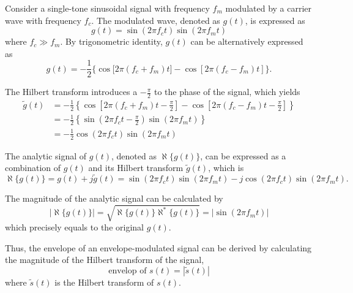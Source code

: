 \documentclass[../ECE459FinalProjectReport.tex]{subfiles}
\begin{document}
Consider a single-tone sinusoidal signal with frequency $f_m$ modulated by a carrier wave with frequency $f_c$. The modulated wave, denoted as $g(t)$, is expressed as
\begin{equation}
    g(t) = \sin(2\pi f_c t)\sin(2\pi f_m t)
\end{equation}
where $f_c\gg f_m$. By trigonometric identity, $g(t)$ can be alternatively expressed as
\begin{equation}
    g(t)=-\frac{1}{2}\{\cos\mathrm[2\pi (f_c+f_m)t]-\cos[2\pi (f_c-f_m)t]\}.
\end{equation}

The Hilbert transform introduces a $-\frac{\pi}{2}$ to the phase of the signal, which yields
\begin{equation}
    \begin{aligned}
        \tilde{g}(t)&=-\frac{1}{2}\left\lbrace\cos\left[2\pi (f_c+f_m)t - \frac{\pi}{2}\right]-\cos\left[2\pi (f_c-f_m)t - \frac{\pi}{2}\right]\right\rbrace\\
        &=-\frac{1}{2}\left\{ \sin\left( 2\pi f_ct-\frac{\pi}{2} \right) \sin\left( 2\pi f_mt \right) \right\} \\
                    &=-\frac{1}{2}\cos\left( 2\pi f_ct \right) \sin\left( 2\pi f_mt \right) 
    \end{aligned}
\end{equation}

The analytic signal of $g(t)$, denoted as $\aleph\{g(t)\}$, can be expressed as a combination of $g(t)$ and its Hilbert transform $\tilde{g}(t)$, which is
\begin{equation}
    \aleph\{g(t)\} = g(t) + j\tilde{g}(t) = \sin(2\pi f_c t)\sin(2\pi f_m t) - j\cos(2\pi f_c t)\sin(2\pi f_m t).
\end{equation}

The magnitude of the analytic signal can be calculated by
\begin{equation}
    \left| \aleph\{g(t)\}\right| = \sqrt{\aleph\{g(t)\}\aleph^*\{g(t)\}} = \left| \sin(2\pi f_m t)\right|
\end{equation}
which precisely equals to the original $g(t)$.

Thus, the envelope of an envelope-modulated signal can be derived by calculating the magnitude of the Hilbert transform of the signal,
\begin{equation}
    \text{envelop of $s(t)$} = \left| \tilde{s}(t) \right|
\end{equation}
where $\tilde{s}(t)$ is the Hilbert transform of $s(t)$.
\end{document}
